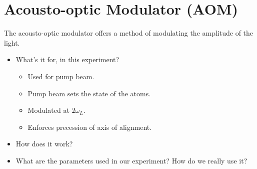 \section{Acousto-optic Modulator (AOM)}

The acousto-optic modulator offers a method of modulating the
amplitude of the light.

\begin{itemize}
\item What's it for, in this experiment?
\begin{itemize}
\item Used for pump beam.
\item Pump beam sets the state of the atoms.
\item Modulated at $2\omega_L$.
\item Enforces precession of axis of alignment.
\end{itemize}
\item How does it work?
\item What are the parameters used in our experiment?  How do we
  really use it?
\end{itemize}





